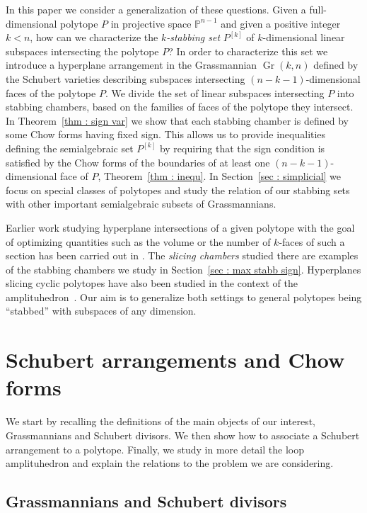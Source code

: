 \documentclass[english]{ourlematema}
\DeclareMathOperator{\Gr}{Gr}
\newcommand{\PP}{\mathbb{P}}
\newcommand{\Pk}{P^{[k]}}
\begin{document}
In this paper we consider a generalization of these questions. Given a full-dimensional polytope $P$ in projective space $\PP^{n-1}$ and given a positive integer $k<n$, how can we characterize the {\em $k$-stabbing set} $\Pk$ of $k$-dimensional linear subspaces intersecting the polytope $P$?
In order to characterize this set we introduce a hyperplane arrangement in the Grassmannian $\Gr(k,n)$ defined by the Schubert varieties describing subspaces intersecting $(n-k-1)$-dimensional faces of the polytope $P$. We divide the set of linear subspaces intersecting $P$ into stabbing chambers, based on the families of faces of the polytope they intersect. In Theorem~\ref{thm : sign var} we show that each stabbing chamber is defined by some Chow forms having fixed sign. This allows us to provide inequalities defining the semialgebraic set $\Pk$ by requiring that the sign condition is satisfied by the Chow forms of the boundaries of at least one $(n-k-1)$-dimensional face of $P$, Theorem~\ref{thm : inequ}. In Section~\ref{sec : simplicial} we focus on special classes of polytopes and study the relation of our stabbing sets with other important semialgebraic subsets of Grassmannians.

Earlier work studying hyperplane intersections of a given polytope with the goal of optimizing quantities such as the volume or the number of $k$-faces of such a section has been carried out in \cite{BestPolytopeSlice}. The \emph{slicing chambers} studied there are examples of the stabbing chambers we study in Section~\ref{sec : max stabb sign}. Hyperplanes slicing cyclic polytopes have also been studied in the context of the amplituhedron~\cite{m=1Amplituhedron}. Our aim is to generalize both settings to general polytopes being ``stabbed'' with subspaces of any dimension.

\section{Schubert arrangements and Chow forms}

We start by recalling the definitions of the main objects of our interest, Grassmannians and Schubert divisors. We then show how to associate a Schubert arrangement to a polytope. Finally, we study in more detail the loop amplituhedron and explain the relations to the problem we are considering.

\subsection{Grassmannians and Schubert divisors}
\end{document}
